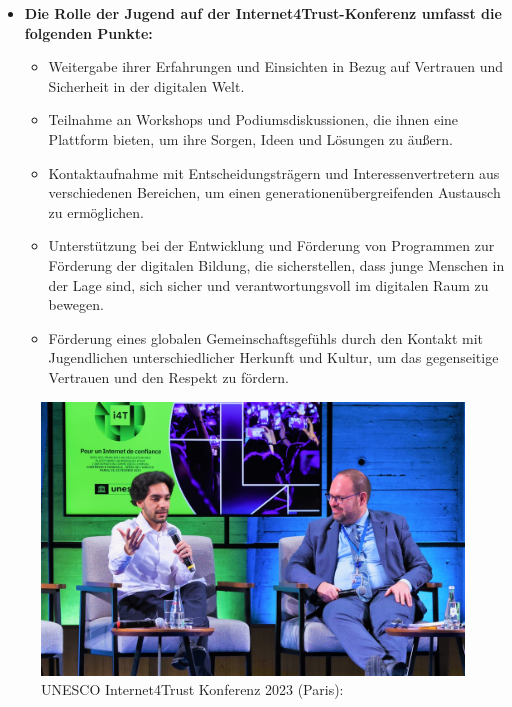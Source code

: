 \begin{itemize}
    \item \textbf{Die Rolle der Jugend auf der Internet4Trust-Konferenz umfasst die folgenden Punkte:}
          \begin{itemize}
              \item {Weitergabe ihrer Erfahrungen und Einsichten in Bezug auf Vertrauen und Sicherheit in der digitalen Welt.}
              \item {Teilnahme an Workshops und Podiumsdiskussionen, die ihnen eine Plattform bieten, um ihre Sorgen, Ideen und Lösungen zu äußern.}
              \item {Kontaktaufnahme mit Entscheidungsträgern und Interessenvertretern aus verschiedenen Bereichen, um einen generationenübergreifenden Austausch zu ermöglichen.}
              \item {Unterstützung bei der Entwicklung und Förderung von Programmen zur Förderung der digitalen Bildung, die sicherstellen, dass junge Menschen in der Lage sind, sich sicher und verantwortungsvoll im digitalen Raum zu bewegen.}
              \item {Förderung eines globalen Gemeinschaftsgefühls durch den Kontakt mit Jugendlichen unterschiedlicher Herkunft und Kultur, um das gegenseitige Vertrauen und den Respekt zu fördern.}
          \end{itemize}
\end{itemize}

\begin{figure}[H]
    \centering
    \includegraphics[width=1\textwidth]{pics/unesco-internet4trust-2023.jpg}
    \caption{UNESCO Internet4Trust Konferenz 2023 (Paris):}
    \label{fig:unesco-internet4trust-2023}
\end{figure}

